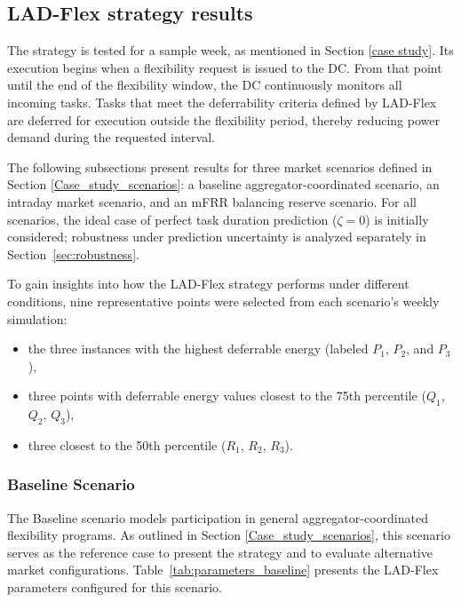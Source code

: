 \documentclass[preprint,12pt]{elsarticle}
\begin{document}
\subsection{LAD-Flex strategy results} \label{LAD_flex_results}

The strategy is tested for a sample week, as mentioned in Section \ref{case study}. Its execution begins when a flexibility request is issued to the DC. From that point until the end of the flexibility window, the DC continuously monitors all incoming tasks. Tasks that meet the deferrability criteria defined by LAD-Flex are deferred for execution outside the flexibility period, thereby reducing power demand during the requested interval.

The following subsections present results for three market scenarios defined in Section \ref{Case_study_scenarios}: a baseline aggregator-coordinated scenario, an intraday market scenario, and an mFRR balancing reserve scenario. For all scenarios, the ideal case of perfect task duration prediction ($\zeta = 0$) is initially considered; robustness under prediction uncertainty is analyzed separately in Section~\ref{sec:robustness}.

To gain insights into how the LAD-Flex strategy performs under different conditions, nine representative points were selected from each scenario's weekly simulation:
\begin{itemize}
    \item the three instances with the highest deferrable energy (labeled $P_1$, $P_2$, and $P_3$),
    \item three points with deferrable energy values closest to the 75th percentile ($Q_1$, $Q_2$, $Q_3$),
    \item three closest to the 50th percentile ($R_1$, $R_2$, $R_3$).
\end{itemize}

\subsubsection{Baseline Scenario} \label{baseline_scenario}

The Baseline scenario models participation in general aggregator-coordinated flexibility programs. As outlined in Section \ref{Case_study_scenarios}, this scenario serves as the reference case to present the strategy and to evaluate alternative market configurations. Table~\ref{tab:parameters_baseline} presents the LAD-Flex parameters configured for this scenario.
\end{document}
